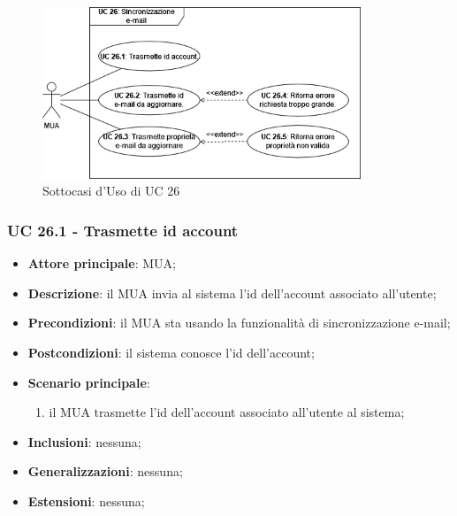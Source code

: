     \begin{figure}[H]
        \includegraphics[width=0.85\textwidth]{sections/uc_imgs/UC26.png}
        \centering
        \caption{Sottocasi d'Uso di UC 26}
    \end{figure}

    \subsubsection{UC 26.1 - Trasmette id account} \label{sec:UC26.1}
    \begin{itemize}
        \item \textbf{Attore principale}: MUA;
        \item \textbf{Descrizione}: il MUA invia al sistema l'id dell'account associato all'utente;
        \item \textbf{Precondizioni}: il MUA sta usando la funzionalità di sincronizzazione e-mail;
        \item \textbf{Postcondizioni}: il sistema conosce l'id dell'account;
        \item \textbf{Scenario principale}:
            \begin{enumerate}
                \item il MUA trasmette l'id dell'account associato all'utente al sistema;
            \end{enumerate}
        \item \textbf{Inclusioni}: nessuna;
        \item \textbf{Generalizzazioni}: nessuna;
        \item \textbf{Estensioni}: nessuna;
    \end{itemize}

